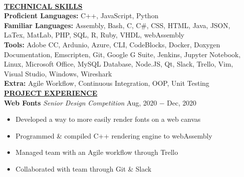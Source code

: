 \documentclass{article}
\begin{document}

\noindent \\
\noindent \textbf{\underline{TECHNICAL SKILLS}} \\
\noindent \textbf{Proficient Languages:} C++, JavaScript, Python \\
\noindent \textbf{Familiar Languages:} Assembly, Bash, C, C\#, CSS, HTML, Java, JSON, LaTex, MatLab, PHP, SQL, R, Ruby, VHDL, webAssembly \\
\noindent \textbf{Tools:} Adobe CC, Ardunio, Azure, CLI, CodeBlocks, Docker, Doxygen Documentation, Emscripten, Git, Google G Suite, Jenkins, Jupyter Notebook, Linux, Microsoft Office, MySQL Database, Node.JS, Qt, Slack, Trello, Vim, Visual Studio, Windows, Wireshark \\
\noindent \textbf{Extra:} Agile Workflow, Continuous Integration, OOP, Unit Testing \\

%
%
%
\noindent \textbf{\underline{PROJECT EXPERIENCE}} \\
\noindent \textbf{Web Fonts} \textit{Senior Design Competition} \hfill  Aug, 2020 $-$ Dec, 2020
\begin{itemize}[noitemsep,nolistsep,leftmargin=*]
\item {Developed a way to more easily render fonts on a web canvas}
\item {Programmed \& compiled C++ rendering engine to webAssembly}
\item {Managed team with an Agile workflow through Trello}
\item {Collaborated with team through Git \& Slack \\}
\end{itemize}
\end{document}
